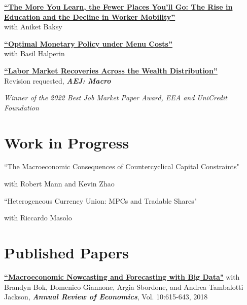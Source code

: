 \documentclass[margin,line]{res}                          %
\newenvironment{list1}{
	\begin{list}{\ding{113}}{%
			\setlength{\itemsep}{0in}
			\setlength{\parsep}{0in} \setlength{\parskip}{0in}
			\setlength{\topsep}{0in} \setlength{\partopsep}{0in}
			\setlength{\leftmargin}{0.17in}}}{\end{list}}
\begin{document}
\begin{resume}
\begin{list1}
		\item[] \href{https://danicaratelli.github.io/research/papers/The_Long_term_Decline_of_the_US_Job_Ladder.pdf}{\textbf{{\color{darkblue}``The More You Learn, the Fewer Places You’ll Go: The Rise in Education and the Decline in Worker Mobility''}}}\\ 
		with Aniket Baksy\smallskip
		
		\vspace{7pt}
				
		\item[] \href{https://danicaratelli.github.io/research/papers/OptimalMP_CaratelliHalperin.pdf}{\textbf{``Optimal Monetary Policy under Menu Costs''}}\\ with Basil Halperin\smallskip
		
		\vspace{7pt}
		
		\item[] \href{https://danicaratelli.github.io/research/papers/JMP_Caratelli.pdf}{\textbf{{\color{darkblue}``Labor Market Recoveries Across the Wealth Distribution''}}}\\
		Revision requested, \textit{\textbf{AEJ: Macro}}
		\item[] \emph{\textit{Winner of the 2022 Best Job Market Paper Award, EEA and UniCredit Foundation}}\smallskip
					
	\end{list1}
	
	\section{\sc Work in Progress}
	\begin{list1}
		\item[] ``The Macroeconomic Consequences of Countercyclical Capital Constraints"		
		\item[]with Robert Mann and Kevin Zhao
		\vspace{7pt}
		\item[] ``Heterogeneous Currency Union: MPCs and Tradable Shares"		
		\item[] with Riccardo Masolo \smallskip
	\end{list1}
	
	\section{\sc Published Papers}
	\begin{list1}
		\item[] \href{https://www.annualreviews.org/doi/abs/10.1146/annurev-economics-083120-111540}{\textbf{``Macroeconomic Nowcasting and Forecasting with Big Data"}} with  Brandyn Bok, Domenico Giannone, Argia Sbordone, and Andrea Tambalotti  Jackson, \textit{\textbf{Annual Review of Economics}}, Vol. 10:615-643, 2018 \smallskip
	\end{list1}
	

\end{resume}
\end{document}
